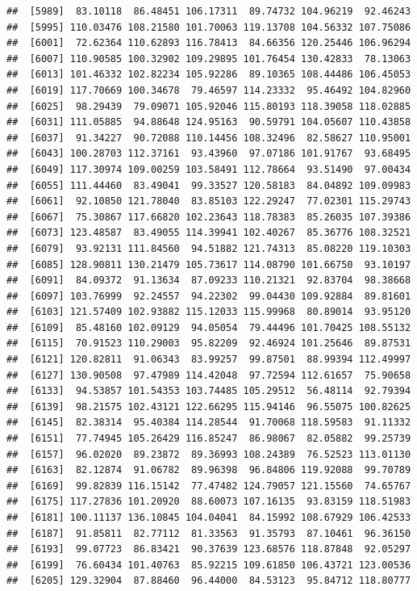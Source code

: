 \documentclass[
]{article}
\begin{document}
\begin{verbatim}
##  [5989]  83.10118  86.48451 106.17311  89.74732 104.96219  92.46243
##  [5995] 110.03476 108.21580 101.70063 119.13708 104.56332 107.75086
##  [6001]  72.62364 110.62893 116.78413  84.66356 120.25446 106.96294
##  [6007] 110.90585 100.32902 109.29895 101.76454 130.42833  78.13063
##  [6013] 101.46332 102.82234 105.92286  89.10365 108.44486 106.45053
##  [6019] 117.70669 100.34678  79.46597 114.23332  95.46492 104.82960
##  [6025]  98.29439  79.09071 105.92046 115.80193 118.39058 118.02885
##  [6031] 111.05885  94.88648 124.95163  90.59791 104.05607 110.43858
##  [6037]  91.34227  90.72088 110.14456 108.32496  82.58627 110.95001
##  [6043] 100.28703 112.37161  93.43960  97.07186 101.91767  93.68495
##  [6049] 117.30974 109.00259 103.58491 112.78664  93.51490  97.00434
##  [6055] 111.44460  83.49041  99.33527 120.58183  84.04892 109.09983
##  [6061]  92.10850 121.78040  83.85103 122.29247  77.02301 115.29743
##  [6067]  75.30867 117.66820 102.23643 118.78383  85.26035 107.39386
##  [6073] 123.48587  83.49055 114.39941 102.40267  85.36776 108.32521
##  [6079]  93.92131 111.84560  94.51882 121.74313  85.08220 119.10303
##  [6085] 128.90811 130.21479 105.73617 114.08790 101.66750  93.10197
##  [6091]  84.09372  91.13634  87.09233 110.21321  92.83704  98.38668
##  [6097] 103.76999  92.24557  94.22302  99.04430 109.92884  89.81601
##  [6103] 121.57409 102.93882 115.12033 115.99968  80.89014  93.95120
##  [6109]  85.48160 102.09129  94.05054  79.44496 101.70425 108.55132
##  [6115]  70.91523 110.29003  95.82209  92.46924 101.25646  89.87531
##  [6121] 120.82811  91.06343  83.99257  99.87501  88.99394 112.49997
##  [6127] 130.90508  97.47989 114.42048  97.72594 112.61657  75.90658
##  [6133]  94.53857 101.54353 103.74485 105.29512  56.48114  92.79394
##  [6139]  98.21575 102.43121 122.66295 115.94146  96.55075 100.82625
##  [6145]  82.38314  95.40384 114.28544  91.70068 118.59583  91.11332
##  [6151]  77.74945 105.26429 116.85247  86.98067  82.05882  99.25739
##  [6157]  96.02020  89.23872  89.36993 108.24389  76.52523 113.01130
##  [6163]  82.12874  91.06782  89.96398  96.84806 119.92088  99.70789
##  [6169]  99.82839 116.15142  77.47482 124.79057 121.15560  74.65767
##  [6175] 117.27836 101.20920  88.60073 107.16135  93.83159 118.51983
##  [6181] 100.11137 136.10845 104.04041  84.15992 108.67929 106.42533
##  [6187]  91.85811  82.77112  81.33563  91.35793  87.10461  96.36150
##  [6193]  99.07723  86.83421  90.37639 123.68576 118.87848  92.05297
##  [6199]  76.60434 101.40763  85.92215 109.61850 106.43721 123.00536
##  [6205] 129.32904  87.88460  96.44000  84.53123  95.84712 118.80777

\end{verbatim}
\end{document}
